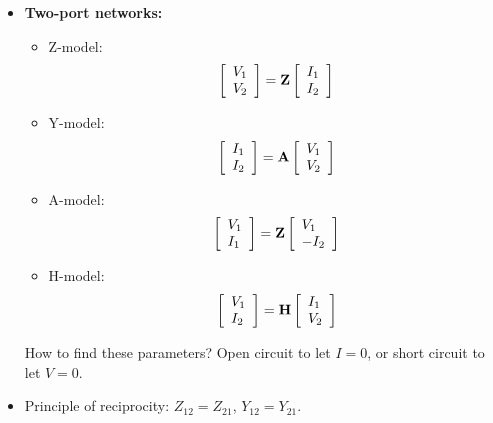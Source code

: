 \documentclass{article}
\begin{document}
\begin{itemize}
\item {\bf Two-port networks:}
  \begin{itemize}
  \item Z-model:
    \begin{equation} 
      \left[ \begin{array}{l} V_1 \\ V_2\end{array} \right]
      ={\bf Z}\left[ \begin{array}{l} I_1 \\ I_2\end{array} \right] 
    \end{equation}
  \item Y-model:
    \begin{equation} 
      \left[ \begin{array}{l} I_1 \\ I_2\end{array} \right]
      ={\bf A}\left[ \begin{array}{l} V_1 \\ V_2\end{array} \right] 
    \end{equation}
  \item A-model:
    \begin{equation}
      \left[ \begin{array}{l} V_1 \\ I_1\end{array} \right]
      ={\bf Z}\left[ \begin{array}{l} V_1 \\ -I_2\end{array} \right] 
    \end{equation}
  \item H-model:
    \begin{equation} 
      \left[ \begin{array}{l} V_1 \\ I_2\end{array} \right]
      ={\bf H}\left[ \begin{array}{l} I_1 \\ V_2\end{array} \right] 
    \end{equation}
  \end{itemize}
  How to find these parameters? Open circuit to let $I=0$, or short circuit to
  let $V=0$.
\item Principle of reciprocity: $Z_{12}=Z_{21}$, $Y_{12}=Y_{21}$.


\end{itemize}
\end{document}
